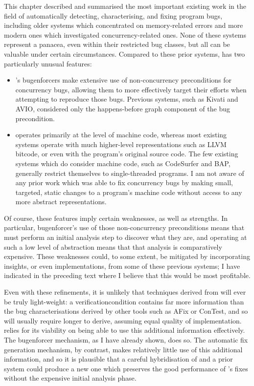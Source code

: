 This chapter described and summarised the most important existing work
in the field of automatically detecting, characterising, and fixing
program bugs, including older systems which concentrated on
memory-related errors and more modern ones which investigated
concurrency-related ones.  None of these systems represent a panacea,
even within their restricted bug classes, but all can be valuable
under certain circumstances.  Compared to these prior systems,
{\technique} has two particularly unusual features:
\begin{itemize}
\item {\Technique}'s \glspl{bugenforcer} make extensive use of
  non-concurrency preconditions for concurrency bugs, allowing them to
  more effectively target their efforts when attempting to reproduce
  those bugs.  Previous systems, such as Kivati and AVIO, considered
  only the happens-before graph component of the bug precondition.
\item {\Technique} operates primarily at the level of machine code,
  whereas most existing systems operate with much higher-level
  representations such as LLVM bitcode, or even with the program's
  original source code.  The few existing systems which do consider
  machine code, such as CodeSurfer and BAP, generally restrict
  themselves to single-threaded programs.  I am not aware of any prior
  work which was able to fix concurrency bugs by making small,
  targeted, static changes to a program's machine code without access
  to any more abstract representations.
\end{itemize}
Of course, these features imply certain weaknesses, as well as
strengths.  In particular, \gls{bugenforcer}'s use of those
non-concurrency preconditions means that {\technique} must perform an
initial analysis step to discover what they are, and operating at such
a low level of abstraction means that that analysis is comparatively
expensive.  These weaknesses could, to some extent, be mitigated by
incorporating insights, or even implementations, from some of these
previous systems; I have indicated in the preceding text where I
believe that this would be most profitable.

Even with these refinements, it is unlikely that techniques derived
from {\technique} will ever be truly light-weight: a {\technique}
\gls{verificationcondition} contains far more information than the bug
characterisations derived by other tools such as AFix or ConTest, and
so will usually require longer to derive, assuming equal quality of
implementation.  {\Technique} relies for its viability on being able
to use this additional information effectively.  The \gls{bugenforcer}
mechanism, as I have already shown, does so.  The automatic fix
generation mechanism, by contrast, makes relatively little use of this
additional information, and so it is plausible that a careful
hybridisation of {\technique} and a prior system could produce a new
one which preserves the good performance of {\technique}'s fixes
without the expensive initial analysis phase.

